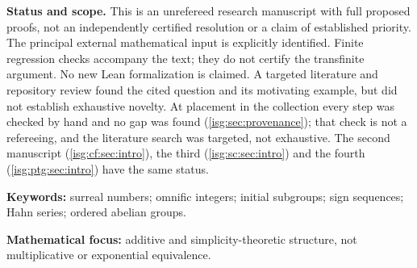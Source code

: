 \documentclass[11pt]{article}
\theoremstyle{definition}
\theoremstyle{remark}
\newcommand{\Z}{\mathbb{Z}}
\begin{document}
\begin{titlepage}
\begin{abstract}
A second manuscript realizes every convex subquotient of an initially
realizable group by sign-tree compression, and shows that a Presburger
group is initially realizable exactly when its residues in
$\widehat{\Z}$ are ordinary integers.
A third manuscript shows that a bounded dyadic formula defines the
standard natural numbers in discretely ordered rings with division by
$2$ and $3$ and a normalized additive map to $\Z$, that the additive
group of a nonstandard model of bounded arithmetic has no nonzero
homomorphism to $\Z$, and that bounded truth in a computable such ring is
as hard as true arithmetic. With the second manuscript's criterion, the
additive group of every nonstandard model of $\mathsf{I}\Delta_0$ is not
initially realizable, whereas open induction does not suffice.
A fourth manuscript identifies the profinite residue image of a
nonstandard model of Peano arithmetic: it consists exactly of the residue
sequences computable from one member of the standard system, which it
recovers as its idempotents. For Borel models, the real and $p$-adic
points computable from the standard system form analytic subfields that
leave a perfect algebraic-independence gap, which survives countably many
extra constants and coefficient-preserving Hahn extension; it yields
continuum many algebraically independent omnific integers that vanish in
every finite quotient.
\end{abstract}
\vspace{2mm}
\begin{statusbox}
\textbf{Status and scope.} This is an unrefereed research manuscript with
full proposed proofs, not an independently certified resolution or a
claim of established priority. The principal external mathematical input
is explicitly identified. Finite regression checks accompany the text;
they do not certify the transfinite argument. No new Lean formalization
is claimed. A targeted literature and repository review found the cited
question and its motivating example, but did not establish exhaustive
novelty. At placement in the collection every step was checked by hand
and no gap was found (\cref{isg:sec:provenance}); that check is not a
refereeing, and the literature search was targeted, not exhaustive.
The second manuscript (\cref{isg:cf:sec:intro}), the third
(\cref{isg:sc:sec:intro}) and the fourth (\cref{isg:ptg:sec:intro})
have the same status.
\end{statusbox}
\vfill
{\small\textbf{Keywords:} surreal numbers; omnific integers; initial
subgroups; sign sequences; Hahn series; ordered abelian groups.\par
\textbf{Mathematical focus:} additive and simplicity-theoretic structure,
not multiplicative or exponential equivalence.}
\end{titlepage}
\hypersetup{pageanchor=true}
\end{document}
